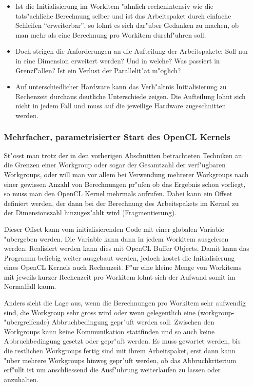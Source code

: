 \begin{refsection}
\begin{itemize}
 \item Ist die Initialisierung im Workitem "ahnlich rechenintensiv wie die
       tats"achliche Berechnung selber und ist das 
       Arbeitspaket durch einfache Schleifen ``erweiterbar'', so lohnt
       es sich dar"uber Gedanken zu machen, ob man mehr als eine Berechnung
       pro Workitem durchf"uhren soll.
 \item Doch steigen die Anforderungen an die Aufteilung der Arbeitspakete:
       Soll nur in eine Dimension erweitert werden? Und in welche? Was 
       passiert in Grenzf"allen? Ist ein Verlust der Parallelit"at m"oglich?
 \item Auf unterschiedlicher Hardware kann das Verh"altnis Initialisierung zu
       Rechenzeit durchaus deutliche Unterschiede zeigen. Die Aufteilung
       lohnt sich nicht in jedem Fall und muss auf die jeweilige Hardware
       zugeschnitten werden.
\end{itemize}




\subsubsection{Mehrfacher, parametrisierter Start des OpenCL Kernels}

St"osst man trotz der in den vorherigen Abschnitten betrachteten Techniken an
die Grenzen einer Workgroup oder sogar der Gesamtzahl der verf"ugbaren
Workgroups, oder will man vor allem bei Verwendung mehrerer Workgroups nach
einer gewissen Anzahl von Berechnungen pr"ufen ob das Ergebnis schon vorliegt,
so muss man den OpenCL Kernel mehrmals aufrufen. Dabei kann ein Offset definiert
werden, der dann bei der Berechnung des Arbeitspakets im Kernel zu der
Dimensionszahl hinzugez"ahlt wird (Fragmentierung).

Dieser Offset kann vom initialisierenden Code mit einer globalen Variable
"ubergeben werden. Die Variable kann dann in jedem Workitem ausgelesen werden.
Realisiert werden kann dies mit OpenCL Buffer Objects. Damit kann das Programm
beliebig weiter ausgebaut werden, jedoch kostet die Initialisierung eines OpenCL
Kernels auch Rechenzeit. F"ur eine kleine Menge von Workitems mit jeweils
kurzer Rechenzeit pro Workitem lohnt sich der Aufwand somit im Normalfall kaum. 

Anders sieht die Lage aus, wenn die Berechnungen pro Workitem sehr aufwendig
sind, die Workgroup sehr gross wird oder wenn gelegentlich eine
(workgroup-"ubergreifende) Abbruchbedingung gepr"uft werden soll. Zwischen den
Workgroups kann keine Kommunikation stattfinden und so auch keine
Abbruchbedingung gesetzt oder gepr"uft werden. Es muss gewartet werden, bis die
restlichen Workgroups fertig sind mit ihrem Arbeitspaket, erst dann kann "uber
mehrere Workgroups hinweg gepr"uft werden, ob das Abbruchkriterium erf"ullt ist
um anschliessend die Ausf"uhrung weiterlaufen zu lassen oder anzuhalten.


\end{refsection}
